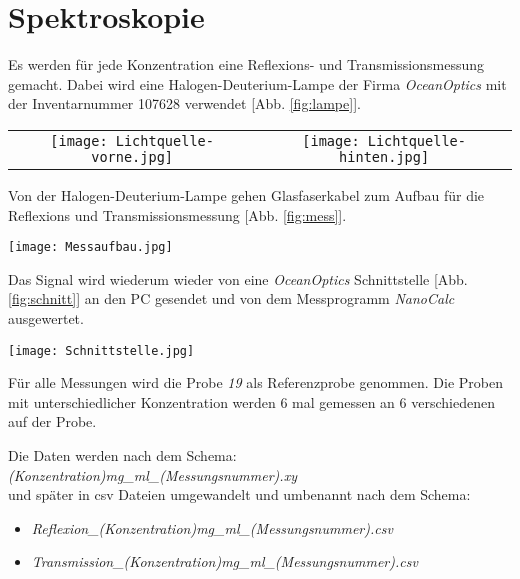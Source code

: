 \section{Spektroskopie}
\label{sec:spectroskopie}

Es werden für jede Konzentration eine Reflexions- und Transmissionsmessung gemacht. Dabei wird eine Halogen-Deuterium-Lampe der Firma \textit{OceanOptics} mit der Inventarnummer 107628 verwendet [Abb. \ref{fig:lampe}].
\begin{center}
	\captionsetup{type=figure}
	\begin{tabular}{c c}
		\texttt{[image: Lichtquelle-vorne.jpg]} & \texttt{[image: Lichtquelle-hinten.jpg]}
	\end{tabular}
	\label{fig:lampe}
\end{center}
\newpage
Von der Halogen-Deuterium-Lampe gehen Glasfaserkabel zum Aufbau für die Reflexions und Transmissionsmessung [Abb. \ref{fig:mess}].
\begin{center}
	\captionsetup{type=figure}
	\texttt{[image: Messaufbau.jpg]}
	\label{fig:mess}
\end{center}
Das Signal wird wiederum wieder von eine \textit{OceanOptics} Schnittstelle [Abb. \ref{fig:schnitt}] an den PC gesendet und von dem Messprogramm \textit{NanoCalc} ausgewertet.
\begin{center}
	\captionsetup{type=figure}
	\texttt{[image: Schnittstelle.jpg]}
	\label{fig:schnitt}
\end{center}
\newpage
Für alle Messungen wird die Probe \textit{19} als Referenzprobe genommen. Die Proben mit unterschiedlicher Konzentration werden 6 mal gemessen an 6 verschiedenen auf der Probe.\bigskip

Die Daten werden nach dem Schema:\\
\textit{(Konzentration)mg\_ml\_(Messungsnummer).xy}\\
und später in csv Dateien umgewandelt und umbenannt nach dem Schema:
\begin{itemize}
	\item \textit{Reflexion\_(Konzentration)mg\_ml\_(Messungsnummer).csv}
	\item \textit{Transmission\_(Konzentration)mg\_ml\_(Messungsnummer).csv}
\end{itemize}

